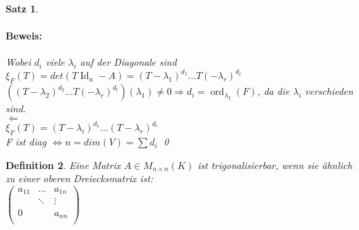\documentclass{report}
\newcommand{\lb}{\lambda}
\DeclareMathOperator{\Id}{Id}
\DeclareMathOperator{\ord}{ord}
\theoremstyle{customrem}
\theoremstyle{customdef}
\newtheorem{definition}{Definition}[chapter]
\newtheorem{satz}[definition]{Satz}
\renewenvironment{proof}{\paragraph{Beweis: }}{\qed}
\theoremstyle{customenv}
\begin{document}
\begin{satz}
\begin{proof}
    Wobei \(d_i\) viele \(\lb_i\) auf der Diagonale sind\\
    \(\xi_F(T) = det(T \Id_n - A) = (T - \lb_1)^{d_1} \dots T(-\lb_r)^{d_t}\)
    \(((T - \lb_2)^{d_2} \dots T(-\lb_r)^{d_t})(\lb_1) \neq 0
    \Rightarrow d_i = \ord_{\lb_I}(F)
    \), da die \(\lb_i\) verschieden sind.\\
    \(\Leftarrow\)\\
    \(\xi_F(T) = (T - \lb_i)^{d_1} \dots (T - \lb_r)^{d_r}\)\\
    F ist diag \(\Leftrightarrow n = dim(V) = \sum d_i\)
  \end{proof}
\end{satz}


\begin{definition}
  Eine Matrix \(A \in M_{n\times n}(K)\) ist 
  trigonalisierbar, wenn sie \"ahnlich zu einer oberen  Dreiecksmatrix ist:\\
  \(
    \begin{pmatrix}
    a_{11} & \dots  & a_{1n}\\
           & \ddots & \vdots\\
    0      &        & a_{nn}\\
    \end{pmatrix}
  \)
\end{definition}
\end{document}
